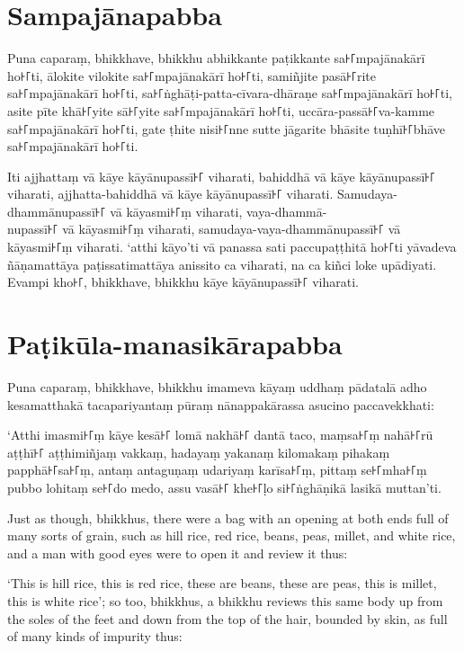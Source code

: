 \paliPage
\section*{Sampajānapabba}

Puna caparaṃ, bhikkhave, bhikkhu abhikkante paṭikkante sa꜔꜒mpajānakārī ho꜔꜒ti,
ālokite vilokite sa꜔꜒mpajānakārī ho꜔꜒ti, samiñjite pasā꜔꜒rite sa꜔꜒mpajānakārī ho꜔꜒ti,
sa꜔꜒ṅghāṭi-patta-cīvara-dhāraṇe sa꜔꜒mpajānakārī ho꜔꜒ti, asite pīte khā꜔꜒yite sā꜔꜒yite
sa꜔꜒mpajānakārī ho꜔꜒ti, uccāra-passā꜔꜒va-kamme sa꜔꜒mpajānakārī ho꜔꜒ti, gate ṭhite nisi꜔꜒nne
sutte jāgarite bhāsite tuṇhī꜔꜒bhāve sa꜔꜒mpajānakārī ho꜔꜒ti.

Iti ajjhattaṃ vā kāye kāyānupassī꜔꜒ viharati, bahiddhā vā kāye kāyānupassī꜔꜒
viharati, ajjhatta-bahiddhā vā kāye kāyānupassī꜔꜒ viharati. Samudaya-dhammānupassī꜔꜒
vā kāyasmi꜔꜒ṃ viharati, vaya-dhammā-\\
nupassī꜔꜒ vā kāyasmi꜔꜒ṃ viharati, samudaya-vaya-dhammānupassī꜔꜒ vā kāyasmi꜔꜒ṃ viharati.
‘atthi kāyo’ti vā panassa sati paccupaṭṭhitā ho꜔꜒ti yāvadeva ñāṇamattāya
paṭissatimattāya anissito ca viharati, na ca kiñci loke upādiyati. Evampi kho꜔꜒,
bhikkhave, bhikkhu kāye kāyānupassī꜔꜒ viharati.


\section*{Paṭikūla-manasikārapabba}

Puna caparaṃ, bhikkhave, bhikkhu imameva kāyaṃ uddhaṃ pādatalā adho kesamatthakā
tacapariyantaṃ pūraṃ nānappakārassa asucino paccavekkhati:

‘Atthi imasmi꜔꜒ṃ kāye kesā꜔꜒ lomā nakhā꜔꜒ dantā taco, maṃsa꜔꜒ṃ nahā꜔꜒rū aṭṭhī꜔꜒ aṭṭhimiñjaṃ
vakkaṃ, hadayaṃ yakanaṃ kilomakaṃ pihakaṃ papphā꜔꜒sa꜔꜒ṃ, antaṃ antaguṇaṃ udariyaṃ
karīsa꜔꜒ṃ, pittaṃ se꜔꜒mha꜔꜒ṃ pubbo lohitaṃ se꜔꜒do medo, assu vasā꜔꜒ khe꜔꜒ḷo si꜔꜒ṅghāṇikā
lasikā muttan’ti.

\englishPage

Just as though, bhikkhus, there were a bag with an opening at both ends full of
many sorts of grain, such as hill rice, red rice, beans, peas, millet, and white
rice, and a man with good eyes were to open it and review it thus:

‘This is hill rice, this is red rice, these are beans, these are peas, this is
millet, this is white rice’; so too, bhikkhus, a bhikkhu reviews this same body
up from the soles of the feet and down from the top of the hair, bounded by
skin, as full of many kinds of impurity thus:

